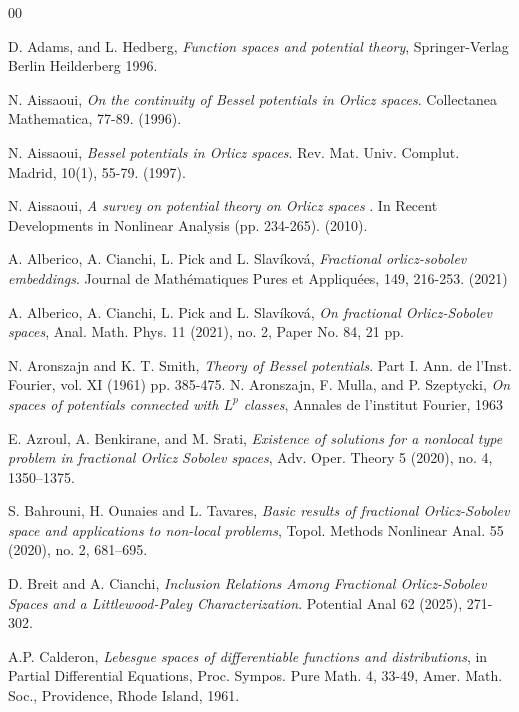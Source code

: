 \documentclass[leqno,twoside, 12pt]{amsart}
\theoremstyle{plain}
\numberwithin{equation}{section} \numberwithin{figure}{section}
\theoremstyle{definition}
\numberwithin{equation}{section}
\begin{document}
\begin{thebibliography}{00}



 D. Adams,  and L. Hedberg, \emph{Function spaces and potential theory}, Springer-Verlag Berlin Heilderberg 1996.

N. Aissaoui,  \emph{On the continuity of Bessel potentials in Orlicz spaces}. Collectanea Mathematica, 77-89. (1996).


N. Aissaoui,   \emph{Bessel potentials in Orlicz spaces}. Rev. Mat. Univ. Complut. Madrid, 10(1), 55-79. (1997).


N. Aissaoui,  \emph{A survey on potential theory on Orlicz spaces} . In Recent Developments in Nonlinear Analysis (pp. 234-265). (2010).
 

A. Alberico, A. Cianchi, L. Pick and L. Slavíková, \emph{Fractional orlicz-sobolev embeddings}. Journal de Mathématiques Pures et Appliquées, 149, 216-253. (2021)

A. Alberico, A. Cianchi, L. Pick and L. Slavíková, \emph{On fractional Orlicz-Sobolev spaces}, Anal. Math. Phys. 11 (2021), no. 2, Paper No. 84, 21 pp.

 N. Aronszajn and K. T. Smith, \emph{Theory of Bessel potentials}. Part I. Ann. de l'Inst. Fourier, vol. XI (1961) pp. 385-475.
N. Aronszajn, F. Mulla, and P. Szeptycki,  \emph{
On spaces of potentials connected with $ L^ p $ classes}, Annales de l'institut Fourier, 1963

E. Azroul, A. Benkirane, and M.  Srati, \emph{Existence of solutions for a nonlocal type problem in fractional Orlicz Sobolev spaces}, 
Adv. Oper. Theory 5 (2020), no. 4, 1350–1375.

S. Bahrouni, H. Ounaies and L. Tavares, \emph{
Basic results of fractional Orlicz-Sobolev space and applications to non-local problems}, Topol. Methods Nonlinear Anal. 55 (2020), no. 2, 681–695.

 D. Breit and A. Cianchi, \emph{Inclusion Relations Among Fractional Orlicz-Sobolev Spaces and a Littlewood-Paley Characterization}. Potential Anal 62 (2025), 271-302.

A.P. Calderon, \emph{Lebesgue spaces of differentiable functions and distributions}, in Partial Differential Equations, Proc. Sympos. Pure Math. 4, 33-49, Amer. Math. Soc., Providence, Rhode Island, 1961.


\end{thebibliography}
\end{document}
